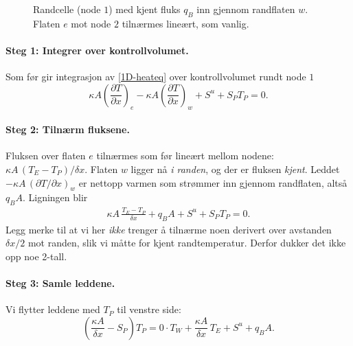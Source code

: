 \begin{figure}[ht]\centering
{}
\caption{Randcelle (node $1$) med kjent fluks $q_B$ inn gjennom randflaten $w$. Flaten $e$ mot node $2$ tilnærmes lineært, som vanlig.}\label{fig:evm_neumann_rand}
\end{figure}

\paragraph{Steg 1: Integrer over kontrollvolumet.} Som før gir integrasjon av \eqref{1D-heateq} over kontrollvolumet rundt node $1$
\[
\kappa A\left(\frac{\partial T}{\partial x}\right)_e - \kappa A\left(\frac{\partial T}{\partial x}\right)_w + S^u + S_P T_P = 0 .
\]

\paragraph{Steg 2: Tilnærm fluksene.} Fluksen over flaten $e$ tilnærmes som før lineært mellom nodene: $\kappa A\,(T_E - T_P)/\delta x$. Flaten $w$ ligger nå \emph{i randen}, og der er fluksen \emph{kjent}. Leddet $-\kappa A\,(\partial T/\partial x)_w$ er nettopp varmen som strømmer inn gjennom randflaten, altså $q_B A$. Ligningen blir
\begin{align}\label{eq:EVM_neumann_rand}
\kappa A\,\frac{T_E - T_P}{\delta x} + q_B A + S^u + S_P T_P = 0 .
\end{align}
Legg merke til at vi her \emph{ikke} trenger å tilnærme noen derivert over avstanden $\delta x/2$ mot randen, slik vi måtte for kjent randtemperatur. Derfor dukker det ikke opp noe 2-tall.

\paragraph{Steg 3: Samle leddene.} Vi flytter leddene med $T_P$ til venstre side:
\[
\left(\frac{\kappa A}{\delta x} - S_P\right) T_P = 0\cdot T_W + \frac{\kappa A}{\delta x}\, T_E + S^u + q_B A .
\]

